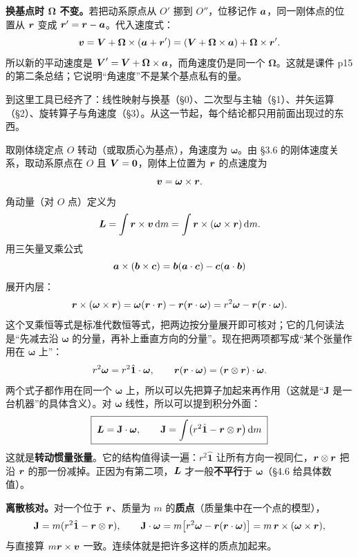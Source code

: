 \documentclass[11pt]{ctexart}
\newcommand{\ten}[1]{\mathbf{#1}}
\newcommand{\unitd}{\hat{\ten{1}}}
\let\orighdr\hdr
\renewcommand{\hdr}[2]{\par\needspace{10\baselineskip}\orighdr{#1}{#2}}
\let\origsubhdr\subhdr
\renewcommand{\subhdr}[1]{\par\needspace{3\baselineskip}\origsubhdr{#1}}
\begin{document}
\textbf{换基点时 $\boldsymbol\Omega$ 不变。}若把动系原点从 $O'$ 挪到 $O''$，位移记作 $\boldsymbol{a}$，同一刚体点的位置从 $\boldsymbol{r}$ 变成 $\boldsymbol{r}'=\boldsymbol{r}-\boldsymbol{a}$。代入速度式：
\[
\boldsymbol{v}=\boldsymbol{V}+\boldsymbol\Omega\times(\boldsymbol{a}+\boldsymbol{r}')
=(\boldsymbol{V}+\boldsymbol\Omega\times\boldsymbol{a})+\boldsymbol\Omega\times\boldsymbol{r}' .
\]
所以新的平动速度是 $\boldsymbol{V}'=\boldsymbol{V}+\boldsymbol\Omega\times\boldsymbol{a}$，而角速度仍是同一个 $\boldsymbol\Omega$。这就是课件 p15 的第二条总结；它说明“角速度”不是某个基点私有的量。

\label{sec:inertia}

到这里工具已经齐了：线性映射与换基（\S0）、二次型与主轴（\S1）、并矢运算（\S2）、旋转算子与角速度（\S3）。从这一节起，每个结论都只用前面出现过的东西。

\label{subsec:inertia-construct}

取刚体绕定点 $O$ 转动（或取质心为基点），角速度为 $\boldsymbol\omega$。由 \S3.6 的刚体速度关系，取动系原点在 $O$ 且 $\boldsymbol{V}=\boldsymbol{0}$，刚体上位置为 $\boldsymbol{r}$ 的点速度为
\[
\boldsymbol{v}=\boldsymbol\omega\times\boldsymbol{r} .
\]
角动量（对 $O$ 点）定义为
\[
\boldsymbol{L}=\int\boldsymbol{r}\times\boldsymbol{v}\,\mathrm{d} m
=\int\boldsymbol{r}\times(\boldsymbol\omega\times\boldsymbol{r})\,\mathrm{d} m .
\]
用三矢量叉乘公式
\[
\boldsymbol{a}\times(\boldsymbol{b}\times\boldsymbol{c})=\boldsymbol{b}(\boldsymbol{a}\cdot\boldsymbol{c})-\boldsymbol{c}(\boldsymbol{a}\cdot\boldsymbol{b})
\]
展开内层：
\[
\boldsymbol{r}\times(\boldsymbol\omega\times\boldsymbol{r})
=\boldsymbol\omega(\boldsymbol{r}\cdot\boldsymbol{r})-\boldsymbol{r}(\boldsymbol{r}\cdot\boldsymbol\omega)
=r^2\boldsymbol\omega-\boldsymbol{r}(\boldsymbol{r}\cdot\boldsymbol\omega).
\]
这个叉乘恒等式是标准代数恒等式，把两边按分量展开即可核对；它的几何读法是“先减去沿 $\boldsymbol\omega$ 的分量，再补上垂直方向的分量”。现在把两项都写成“某个张量作用在 $\boldsymbol\omega$ 上”：
\[
r^2\boldsymbol\omega=r^2\unitd\cdot\boldsymbol\omega,
\qquad
\vect r(\vect r\cdot\boldsymbol\omega)=(\vect r\otimes\vect r)\cdot\boldsymbol\omega .
\]
两个式子都作用在同一个 $\boldsymbol\omega$ 上，所以可以先把算子加起来再作用（这就是“$\ten J$ 是一台机器”的具体含义）。对 $\boldsymbol\omega$ 线性，所以可以提到积分外面：
\[
\boxed{\;\vect L=\ten J\cdot\boldsymbol\omega,\qquad
\ten J=\int\bigl(r^2\unitd-\vect r\otimes\vect r\bigr)\dd m\;}
\]
这就是\textbf{转动惯量张量}。它的结构值得读一遍：$r^2\unitd$ 让所有方向一视同仁，$\boldsymbol{r}\otimes\boldsymbol{r}$ 把沿 $\boldsymbol{r}$ 的那一份减掉。正因为有第二项，$\boldsymbol{L}$ 才一般\textbf{不平行}于 $\boldsymbol\omega$（\S4.6 给具体数值）。

\textbf{离散核对。}对一个位于 $\boldsymbol{r}$、质量为 $m$ 的\textbf{质点}（质量集中在一个点的模型），
\[
\ten J=m(r^2\unitd-\vect r\otimes\vect r),
\qquad
\ten J\cdot\boldsymbol\omega=m\bigl[r^2\boldsymbol\omega-\vect r(\vect r\cdot\boldsymbol\omega)\bigr]=m\,\vect r\times(\boldsymbol\omega\times\vect r),
\]
与直接算 $m\boldsymbol{r}\times\boldsymbol{v}$ 一致。连续体就是把许多这样的质点加起来。
\end{document}
